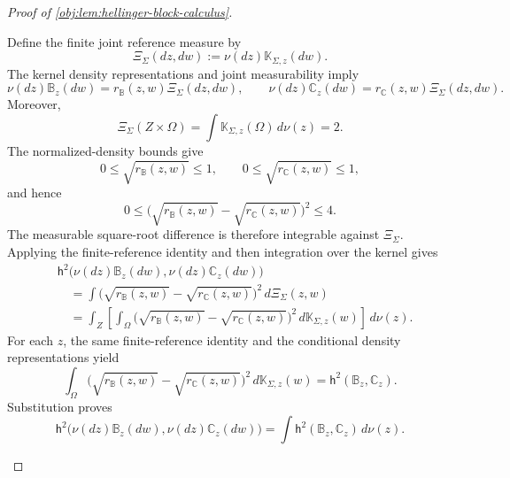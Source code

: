 \begin{proof}[Proof of \cref{obj:lem:hellinger-block-calculus}]
\begin{enumerate}
Define the finite joint reference measure by
\[
\Xi_{\Sigma}(dz,dw):=\nu(dz)\mathbb K_{\Sigma,z}(dw).
\]
The kernel density representations and joint measurability imply
\[
\nu(dz)\mathbb B_z(dw)
   =r_{\mathbb B}(z,w)\Xi_{\Sigma}(dz,dw),
\qquad
\nu(dz)\mathbb C_z(dw)
   =r_{\mathbb C}(z,w)\Xi_{\Sigma}(dz,dw).
\]
Moreover,
\[
\Xi_{\Sigma}(Z\times\Omega)
=\int\mathbb K_{\Sigma,z}(\Omega)\,d\nu(z)=2.
\]
The normalized-density bounds give
\[
0\le\sqrt{r_{\mathbb B}(z,w)}\le1,
\qquad
0\le\sqrt{r_{\mathbb C}(z,w)}\le1,
\]
and hence
\[
0\le
\bigl(\sqrt{r_{\mathbb B}(z,w)}
      -\sqrt{r_{\mathbb C}(z,w)}\bigr)^2
\le4.
\]
The measurable square-root difference is therefore integrable against \(\Xi_{\Sigma}\). Applying the finite-reference identity and then integration over the kernel gives
\[
\begin{aligned}
&\mathsf h^2\bigl(\nu(dz)\mathbb B_z(dw),
                 \nu(dz)\mathbb C_z(dw)\bigr)\\
&\quad=
\int
\bigl(\sqrt{r_{\mathbb B}(z,w)}
      -\sqrt{r_{\mathbb C}(z,w)}\bigr)^2
\,d\Xi_{\Sigma}(z,w)\\
&\quad=
\int_Z
\left[
\int_\Omega
\bigl(\sqrt{r_{\mathbb B}(z,w)}
      -\sqrt{r_{\mathbb C}(z,w)}\bigr)^2
\,d\mathbb K_{\Sigma,z}(w)
\right]\,d\nu(z).
\end{aligned}
\]
For each \(z\), the same finite-reference identity and the conditional density representations yield
\[
\int_\Omega
\bigl(\sqrt{r_{\mathbb B}(z,w)}
      -\sqrt{r_{\mathbb C}(z,w)}\bigr)^2
\,d\mathbb K_{\Sigma,z}(w)
=
\mathsf h^2(\mathbb B_z,\mathbb C_z).
\]
Substitution proves
\[
\mathsf h^2\bigl(\nu(dz)\mathbb B_z(dw),
                \nu(dz)\mathbb C_z(dw)\bigr)
=
\int\mathsf h^2(\mathbb B_z,\mathbb C_z)\,d\nu(z).
\]


\end{enumerate}
\end{proof}
